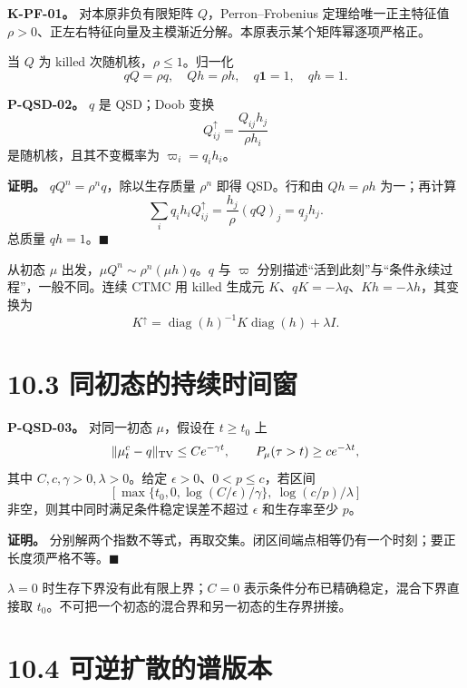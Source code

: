 \documentclass[
  11pt,
  oneside]{book}
\begin{document}
\textbf{K-PF-01。} 对本原非负有限矩阵 \(Q\)，Perron--Frobenius 定理给唯一正主特征值 \(\rho>0\)、正左右特征向量及主模渐近分解。本原表示某个矩阵幂逐项严格正。

当 \(Q\) 为 killed 次随机核，\(\rho\le1\)。归一化 \[qQ=\rho q,\quad Qh=\rho h,\quad q\mathbf1=1,\quad qh=1.\]

\hypertarget{p-qsd-02}{}\label{p-qsd-02}

\textbf{P-QSD-02。} \(q\) 是 QSD；Doob 变换 \[Q^\uparrow_{ij}=\frac{Q_{ij}h_j}{\rho h_i}\] 是随机核，且其不变概率为 \(\varpi_i=q_i h_i\)。

\textbf{证明。} \(qQ^n=\rho^nq\)，除以生存质量 \(\rho^n\) 即得 QSD。行和由 \(Qh=\rho h\) 为一；再计算 \[\sum_iq_i h_i Q^\uparrow_{ij}
=\frac{h_j}{\rho}(qQ)_j=q_jh_j.\] 总质量 \(qh=1\)。\(\blacksquare\)

从初态 \(\mu\) 出发，\(\mu Q^n\sim\rho^n(\mu h)q\)。\(q\) 与 \(\varpi\) 分别描述``活到此刻''与``条件永续过程''，一般不同。连续 CTMC 用 killed 生成元 \(K\)、\(qK=-\lambda q\)、\(Kh=-\lambda h\)，其变换为 \[K^\uparrow=\operatorname{diag}(h)^{-1}K\operatorname{diag}(h)+\lambda I.\]

\section{10.3 同初态的持续时间窗}\label{ux540cux521dux6001ux7684ux6301ux7eedux65f6ux95f4ux7a97}

\hypertarget{p-qsd-03}{}\label{p-qsd-03}

\textbf{P-QSD-03。} 对同一初态 \(\mu\)，假设在 \(t\ge t_0\) 上 \[\|\mu_t^c-q\|_{\rm TV}\le Ce^{-\gamma t},\qquad
P_\mu(\tau>t)\ge ce^{-\lambda t},\] 其中 \(C,c,\gamma>0,\lambda>0\)。给定 \(\epsilon>0\)、\(0<p\le c\)，若区间 \[\left[\max\{t_0,0,\log(C/\epsilon)/\gamma\},
\ \log(c/p)/\lambda\right]\] 非空，则其中同时满足条件稳定误差不超过 \(\epsilon\) 和生存率至少 \(p\)。

\textbf{证明。} 分别解两个指数不等式，再取交集。闭区间端点相等仍有一个时刻；要正长度须严格不等。\(\blacksquare\)

\(\lambda=0\) 时生存下界没有此有限上界；\(C=0\) 表示条件分布已精确稳定，混合下界直接取 \(t_0\)。不可把一个初态的混合界和另一初态的生存界拼接。

\section{10.4 可逆扩散的谱版本}\label{ux53efux9006ux6269ux6563ux7684ux8c31ux7248ux672c}
\end{document}
